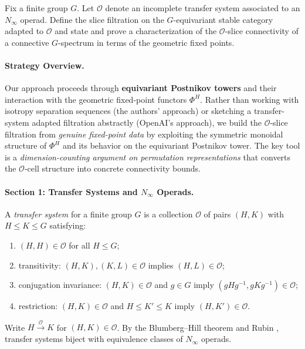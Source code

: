 
Fix a finite group $G$. Let $\mathcal{O}$ denote an incomplete transfer system
associated to an $N_\infty$ operad. Define the slice filtration on the
$G$-equivariant stable category adapted to $\mathcal{O}$ and state and prove a
characterization of the $\mathcal{O}$-slice connectivity of a connective
$G$-spectrum in terms of the geometric fixed points.


\paragraph{Strategy Overview.}
Our approach proceeds through \textbf{equivariant Postnikov towers} and
their interaction with the geometric fixed-point functors $\Phi^H$.
Rather than working with isotropy separation sequences (the authors'
approach) or sketching a transfer-system adapted filtration abstractly
(OpenAI's approach), we build the $\mathcal{O}$-slice filtration from
\emph{genuine fixed-point data} by exploiting the symmetric monoidal
structure of $\Phi^H$ and its behavior on the equivariant Postnikov tower.
The key tool is a \emph{dimension-counting argument on permutation
representations} that converts the $\mathcal{O}$-cell structure into
concrete connectivity bounds.


\paragraph{Section 1: Transfer Systems and $N_\infty$ Operads.}

\begin{definition}\label{def:p5-ts}
A \emph{transfer system} for a finite group $G$ is a collection
$\mathcal{O}$ of pairs $(H,K)$ with $H \leq K \leq G$ satisfying:
\begin{enumerate}
  \item[(T1)] $(H,H) \in \mathcal{O}$ for all $H \leq G$;
  \item[(T2)] transitivity: $(H,K), (K,L) \in \mathcal{O}$ implies $(H,L) \in \mathcal{O}$;
  \item[(T3)] conjugation invariance: $(H,K) \in \mathcal{O}$ and $g \in G$ imply $(gHg^{-1}, gKg^{-1}) \in \mathcal{O}$;
  \item[(T4)] restriction: $(H,K) \in \mathcal{O}$ and $H \leq K' \leq K$ imply $(H,K') \in \mathcal{O}$.
\end{enumerate}
Write $H \xrightarrow{\mathcal{O}} K$ for $(H,K) \in \mathcal{O}$.
By the Blumberg--Hill theorem \cite{BH} and Rubin \cite{Rub}, transfer
systems biject with equivalence classes of $N_\infty$ operads.
\end{definition}

